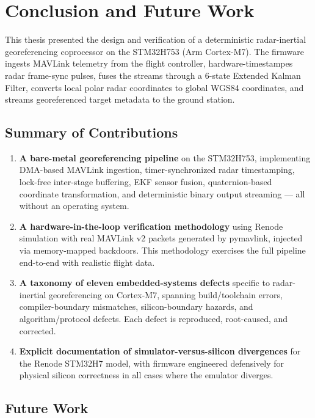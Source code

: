 \chapter{Conclusion and Future Work}
\label{ch:conclusion}

This thesis presented the design and verification of a deterministic radar-inertial georeferencing coprocessor on the STM32H753 (Arm Cortex-M7). The firmware ingests MAVLink telemetry from the flight controller, hardware-timestampes radar frame-sync pulses, fuses the streams through a 6-state Extended Kalman Filter, converts local polar radar coordinates to global WGS84 coordinates, and streams georeferenced target metadata to the ground station.

\section{Summary of Contributions}

\begin{enumerate}
\item \textbf{A bare-metal georeferencing pipeline} on the STM32H753, implementing DMA-based MAVLink ingestion, timer-synchronized radar timestamping, lock-free inter-stage buffering, EKF sensor fusion, quaternion-based coordinate transformation, and deterministic binary output streaming --- all without an operating system.

\item \textbf{A hardware-in-the-loop verification methodology} using Renode simulation with real MAVLink v2 packets generated by pymavlink, injected via memory-mapped backdoors. This methodology exercises the full pipeline end-to-end with realistic flight data.

\item \textbf{A taxonomy of eleven embedded-systems defects} specific to radar-inertial georeferencing on Cortex-M7, spanning build/toolchain errors, compiler-boundary mismatches, silicon-boundary hazards, and algorithm/protocol defects. Each defect is reproduced, root-caused, and corrected.

\item \textbf{Explicit documentation of simulator-versus-silicon divergences} for the Renode STM32H7 model, with firmware engineered defensively for physical silicon correctness in all cases where the emulator diverges.
\end{enumerate}

\section{Future Work}

